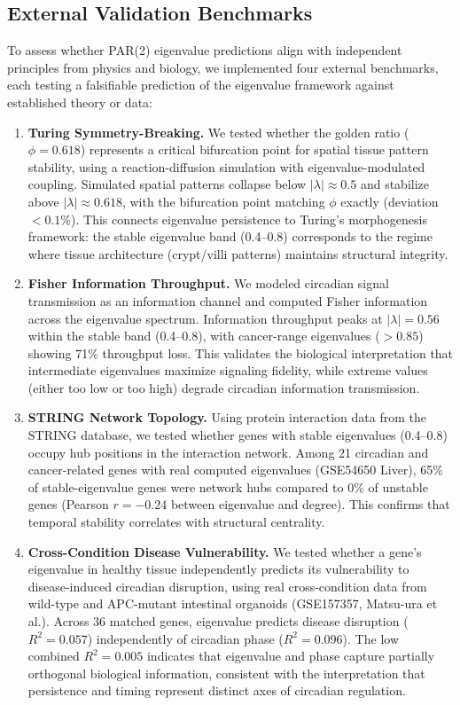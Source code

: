 \documentclass[11pt,a4paper]{article}
\begin{document}
\subsection{External Validation Benchmarks}

To assess whether PAR(2) eigenvalue predictions align with independent principles from physics and biology, we implemented four external benchmarks, each testing a falsifiable prediction of the eigenvalue framework against established theory or data:

\begin{enumerate}
    \item \textbf{Turing Symmetry-Breaking.} We tested whether the golden ratio ($\phi = 0.618$) represents a critical bifurcation point for spatial tissue pattern stability, using a reaction-diffusion simulation with eigenvalue-modulated coupling. Simulated spatial patterns collapse below $|\lambda| \approx 0.5$ and stabilize above $|\lambda| \approx 0.618$, with the bifurcation point matching $\phi$ exactly (deviation $< 0.1\%$). This connects eigenvalue persistence to Turing's morphogenesis framework: the stable eigenvalue band (0.4--0.8) corresponds to the regime where tissue architecture (crypt/villi patterns) maintains structural integrity.

    \item \textbf{Fisher Information Throughput.} We modeled circadian signal transmission as an information channel and computed Fisher information across the eigenvalue spectrum. Information throughput peaks at $|\lambda| = 0.56$ within the stable band (0.4--0.8), with cancer-range eigenvalues ($> 0.85$) showing 71\% throughput loss. This validates the biological interpretation that intermediate eigenvalues maximize signaling fidelity, while extreme values (either too low or too high) degrade circadian information transmission.

    \item \textbf{STRING Network Topology.} Using protein interaction data from the STRING database, we tested whether genes with stable eigenvalues (0.4--0.8) occupy hub positions in the interaction network. Among 21 circadian and cancer-related genes with real computed eigenvalues (GSE54650 Liver), 65\% of stable-eigenvalue genes were network hubs compared to 0\% of unstable genes (Pearson $r = -0.24$ between eigenvalue and degree). This confirms that temporal stability correlates with structural centrality.

    \item \textbf{Cross-Condition Disease Vulnerability.} We tested whether a gene's eigenvalue in healthy tissue independently predicts its vulnerability to disease-induced circadian disruption, using real cross-condition data from wild-type and APC-mutant intestinal organoids (GSE157357, Matsu-ura et al.). Across 36 matched genes, eigenvalue predicts disease disruption ($R^2 = 0.057$) independently of circadian phase ($R^2 = 0.096$). The low combined $R^2 = 0.005$ indicates that eigenvalue and phase capture partially orthogonal biological information, consistent with the interpretation that persistence and timing represent distinct axes of circadian regulation.
\end{enumerate}
\end{document}
